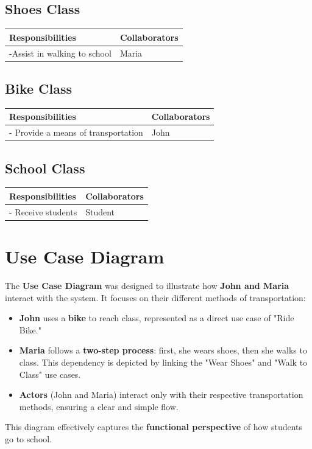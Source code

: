 \begin{description}
\subsection{Shoes Class}
\begin{center}
\begin{tabular}{|p{5cm}|p{5cm}|}
    \hline
    \textbf{Responsibilities} & \textbf{Collaborators} \\
    \hline
    -Assist in walking to school & Maria \\
    \hline
\end{tabular}
\end{center}

\subsection{Bike Class}
\begin{center}
\begin{tabular}{|p{5cm}|p{5cm}|}
    \hline
    \textbf{Responsibilities} & \textbf{Collaborators} \\
    \hline
    - Provide a means of transportation & John \\
    \hline
\end{tabular}
\end{center}

\subsection{School Class}
\begin{center}
\begin{tabular}{|p{5cm}|p{5cm}|}
    \hline
    \textbf{Responsibilities} & \textbf{Collaborators} \\
    \hline
    - Receive students  & Student\\
    \hline
\end{tabular}
\end{center}
 \end{description}
 
\section{Use Case Diagram}
The \textbf{Use Case Diagram} was designed to illustrate how \textbf{John and Maria} interact with the system. It focuses on their different methods of transportation:
\begin{itemize}
    \item \textbf{John} uses a \textbf{bike} to reach class, represented as a direct use case of "Ride Bike."
    \item \textbf{Maria} follows a \textbf{two-step process}: first, she wears shoes, then she walks to class. This dependency is depicted by linking the "Wear Shoes" and "Walk to Class" use cases.
    \item \textbf{Actors} (John and Maria) interact only with their respective transportation methods, ensuring a clear and simple flow.
\end{itemize}
This diagram effectively captures the \textbf{functional perspective} of how students go to school.

